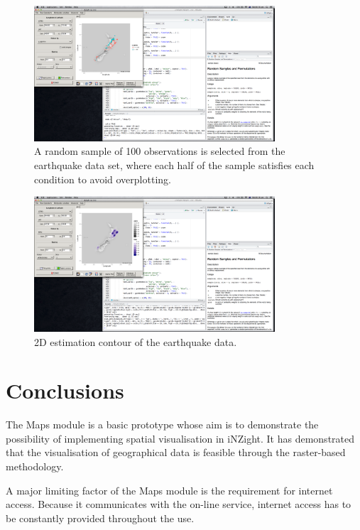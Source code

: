 \documentclass[a4paper, 12pt]{article}
\begin{document}
\begin{figure}[H]
	\centering
	\includegraphics[trim=0cm 15.32cm 37cm 0.72cm, clip, width=0.8\textwidth]{demo3}
	\caption{A random sample of 100 observations is selected from the earthquake data set, where each half of the sample satisfies each condition to avoid overplotting.}
	\label{fig:2}
\end{figure}

\begin{figure}[H]
	\centering
	\includegraphics[trim=0cm 15.32cm 37cm 0.72cm, clip, width=0.8\textwidth]{demo2}
	\caption{2D estimation contour of the earthquake data.}
	\label{fig:3}
\end{figure}


\section{Conclusions}
The Maps module is a basic prototype whose aim is to demonstrate the possibility of implementing spatial visualisation in iNZight. It has demonstrated that the visualisation of geographical data is feasible through the raster-based methodology.

A major limiting factor of the Maps module is the requirement for internet access. Because it communicates with the on-line service, internet access has to be constantly provided throughout the use.
\end{document}
